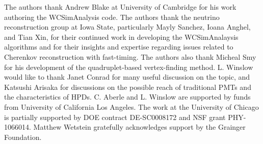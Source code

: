 \documentclass[cits]{JINST}
\begin{document}
\acknowledgments
The authors thank Andrew Blake at University of Cambridge for his work
authoring the WCSimAnalysis code. The authors thank the neutrino
reconstruction group at Iowa State, particularly Mayly Sanchez, Ioana
Anghel, and Tian Xin, for their continued work in developing the
WCSimAnalaysis algorithms and for their insights and expertise
regarding issues related to Cherenkov reconstruction with
fast-timing. The authors also thank Micheal Smy for his development of
the quadruplet-based vertex-finding method. L. Winslow would like to
thank Janet Conrad for many useful discussion on the topic, and
Katsushi Arisaka for discussions on the possible reach of traditional PMTs
and the characteristics of HPDs. C. Aberle and L. Winslow are
supported by funds from University of California Los Angeles. The work
at the University of Chicago is partially supported by DOE
contract DE-SC0008172 and NSF grant PHY-1066014. Matthew Wetstein gratefully
acknowledges support by the Grainger Foundation.

\newpage


 
\end{document}

